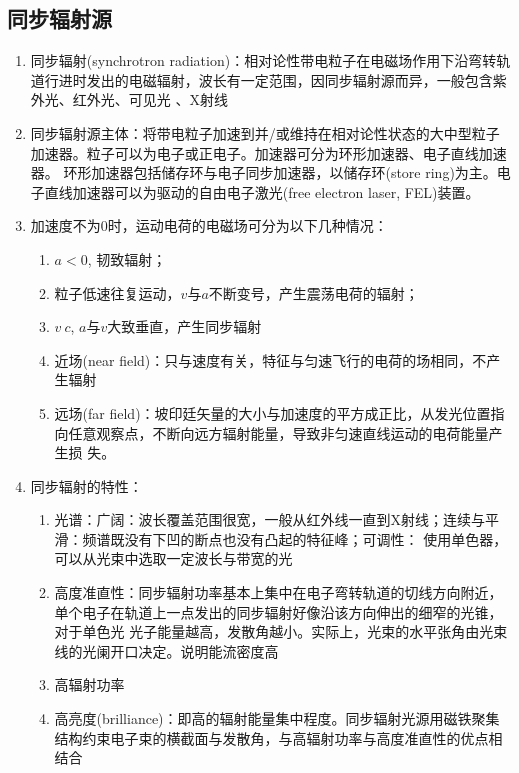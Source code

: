 \documentclass[12pt,a4paper]{article}
\begin{document}
    \subsection{同步辐射源}
    \begin{enumerate}
        \item 同步辐射(synchrotron radiation)：相对论性带电粒子在电磁场作用下沿弯转轨道行进时发出的电磁辐射，波长有一定范围，因同步辐射源而异，一般包含紫外光、红外光、可见光
            、X射线
        \item 同步辐射源主体：将带电粒子加速到并/或维持在相对论性状态的大中型粒子加速器。粒子可以为电子或正电子。加速器可分为环形加速器、电子直线加速器。
            环形加速器包括储存环与电子同步加速器，以储存环(store ring)为主。电子直线加速器可以为驱动的自由电子激光(free electron laser, FEL)装置。
        \item 加速度不为0时，运动电荷的电磁场可分为以下几种情况：
            \begin{enumerate}
                \item $a<0$, 韧致辐射；
                \item 粒子低速往复运动，$v$与$a$不断变号，产生震荡电荷的辐射；
                \item $v~c$, $a$与$v$大致垂直，产生同步辐射
                \item 近场(near field)：只与速度有关，特征与匀速飞行的电荷的场相同，不产生辐射
                \item 远场(far field)：坡印廷矢量的大小与加速度的平方成正比，从发光位置指向任意观察点，不断向远方辐射能量，导致非匀速直线运动的电荷能量产生损
                失。
            \end{enumerate}
        \item 同步辐射的特性：
            \begin{enumerate}
                \item 光谱：广阔：波长覆盖范围很宽，一般从红外线一直到X射线；连续与平滑：频谱既没有下凹的断点也没有凸起的特征峰；可调性：
                    使用单色器，可以从光束中选取一定波长与带宽的光
                \item 高度准直性：同步辐射功率基本上集中在电子弯转轨道的切线方向附近，单个电子在轨道上一点发出的同步辐射好像沿该方向伸出的细窄的光锥，对于单色光
                    光子能量越高，发散角越小。实际上，光束的水平张角由光束线的光阑开口决定。说明能流密度高
                \item 高辐射功率
                \item 高亮度(brilliance)：即高的辐射能量集中程度。同步辐射光源用磁铁聚集结构约束电子束的横截面与发散角，与高辐射功率与高度准直性的优点相结合

\end{enumerate}
\end{enumerate}
\end{document}
